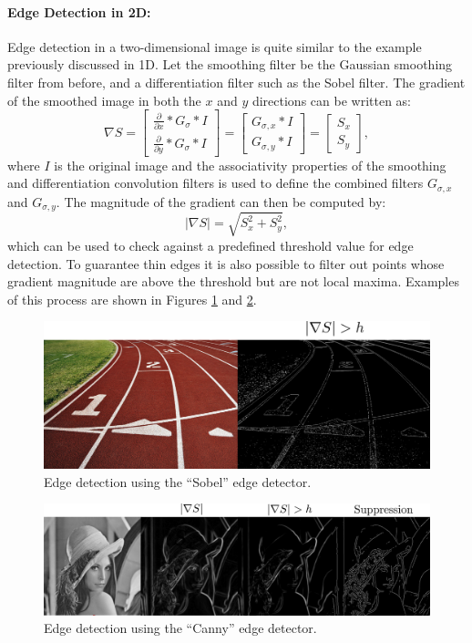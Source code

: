 \paragraph{Edge Detection in 2D:}
Edge detection in a two-dimensional image is quite similar to the example previously discussed in 1D. Let the smoothing filter be the Gaussian smoothing filter from before, and a differentiation filter such as the Sobel filter. The gradient of the smoothed image in both the $x$ and $y$ directions can be written as:
\begin{equation*}
\nabla S= \begin{bmatrix}
\frac{\partial}{\partial x} * G_\sigma * I \\ \frac{\partial}{\partial y} * G_\sigma * I \end{bmatrix}= \begin{bmatrix}
G_{\sigma,x} * I\\G_{\sigma,y} * I
\end{bmatrix}=\begin{bmatrix}
S_x\\S_y
\end{bmatrix},
\end{equation*}
where $I$ is the original image and the associativity properties of the smoothing and differentiation convolution filters is used to define the combined filters $G_{\sigma,x}$ and $G_{\sigma,y}$. The magnitude of the gradient can then be computed by:
\begin{equation*}
\lvert\nabla S\rvert =\sqrt{S_x^2+S_y^2},
\end{equation*}
which can be used to check against a predefined threshold value for edge detection. To guarantee thin edges it is also possible to filter out points whose gradient magnitude are above the threshold but are not local maxima. Examples of this process are shown in Figures \ref{fig:sobel} and \ref{fig:canny}.
\begin{figure}[ht]
  \centering
  \includegraphics[width=.8\textwidth]{tex/figs/ch10_figs/sobel.png}
    \caption{Edge detection using the ``Sobel'' edge detector.}
    \label{fig:sobel}
\end{figure}
\begin{figure}[ht]
  \centering
  \includegraphics[width=.8\textwidth]{tex/figs/ch10_figs/canny.png}
    \caption{Edge detection using the ``Canny'' edge detector.}
    \label{fig:canny}
\end{figure}

